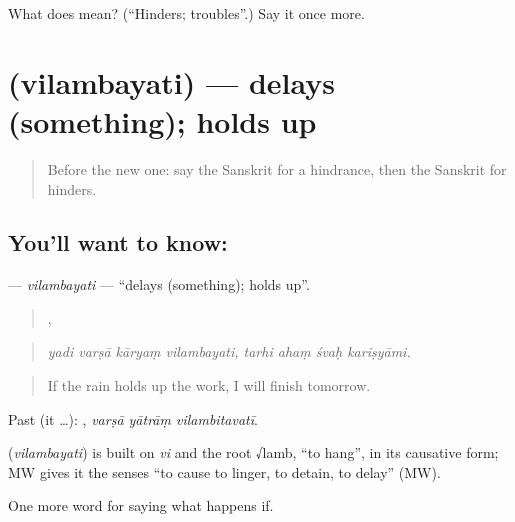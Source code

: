 \begin{tcolorbox}[breakable,colback=teal!4,colframe=teal!35!black,title={Before you move on}]
What does  mean? (\textquotedblleft{}Hinders; troubles\textquotedblright{}.) Say it once more.
\end{tcolorbox}
\section[\texorpdfstring{\sk{विलम्बयति} (vilambayati)}{विलम्बयति (vilambayati)}]{ (vilambayati) — delays (something); holds up}

\label{lesson:SA-C372-vilambayati}



\begin{quote}
Before the new one: say the Sanskrit for a hindrance, then the Sanskrit for hinders.
\end{quote}

\subsection*{You'll want to know: }
\textbf{} — \emph{vilambayati} — \textquotedblleft{}delays (something); holds up\textquotedblright{}.

\begin{quote}
   ,    
\end{quote}

\begin{quote}
\emph{yadi varṣā kāryaṃ vilambayati, tarhi ahaṃ śvaḥ kariṣyāmi.}
\end{quote}

\begin{quote}
If the rain holds up the work, I will finish tomorrow.
\end{quote}

Past (it …):   , \emph{varṣā yātrāṃ vilambitavatī}.

\begin{cousinweb}
\textbf{} (\emph{vilambayati}) is built on \emph{vi} and the root √lamb, \textquotedblleft{}to hang\textquotedblright{}, in its causative form; MW gives it the senses \textquotedblleft{}to cause to linger, to detain, to delay\textquotedblright{} (MW).
\end{cousinweb}

\begin{grammarlens}[title={What you've built}]
One more word for saying what happens if.
\end{grammarlens}

